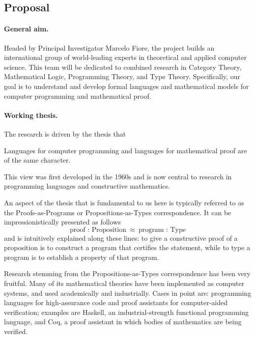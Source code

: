 \documentclass[11pt,twocolumn]{article}
\newenvironment{myquote}
  {\begin{list}{}
  {\setlength{\topsep}{2pt}
   \setlength{\partopsep}{2pt}
   \setlength{\itemsep}{2.5pt}
   \setlength{\parsep}{2.5pt}
   \setlength{\rightmargin}{1em}
   \setlength{\leftmargin}{1em}
   \setlength{\labelwidth}{.5em}}}
  {\end{list}}
\begin{document}
\clearpage
{}

\subsection{Proposal}
\label{Proposal}

\paragraph*{General aim.}

Headed by Principal Investigator Marcelo Fiore, the project builds an
international group of world-leading experts in theoretical and applied
computer science.  This team will be dedicated to combined research in
Category Theory, Mathematical Logic, Programming Theory, and Type Theory.
Specifically, our goal is to understand and develop formal languages and
mathematical models for computer programming and mathematical proof. 

\paragraph*{Working thesis.}

The research is driven by the thesis that
\begin{myquote}
\item
Languages for computer programming and languages for mathematical proof are of
the same character.
\end{myquote}
This view was first developed in the 1960s and is now central to research in
programming languages and constructive mathematics.

An aspect of the thesis that is fundamental to us here is typically referred
to as the Proofs-as-Programs or Propositions-as-Types correspondence.  It can
be impressionistically presented as follows
\[
  \mbox{proof : Proposition} 
  \enspace \approx \enspace 
  \mbox{program : Type} 
\]
and is intuitively explained along these lines: to give a constructive proof
of a proposition is to construct a program that certifies the statement, while
to type a program is to establish a property of that program.

Research stemming from the Propositions-as-Types correspondence has been very
fruitful.  Many of its mathematical theories have been implemented as computer
systems, and used academically and industrially.  Cases in point are:
programming languages for high-assurance code and proof assistants for
computer-aided verification; examples are Haskell, %
an industrial-strength functional programming language, and Coq, %
a proof assistant in which bodies of mathematics are being verified.
\end{document}
